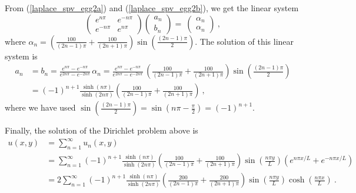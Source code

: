 \begin{egg}
From (\ref{laplace_spv_egg2a}) and (\ref{laplace_spv_egg2b}), we get
the linear system
\[
\begin{pmatrix}
e^{n\pi} & e^{-n\pi} \\
e^{-n\pi} & e^{n\pi}
\end{pmatrix}
\begin{pmatrix}
a_n \\ b_n
\end{pmatrix}
=\
\begin{pmatrix}
 \alpha_n \\ \alpha_n
\end{pmatrix} \ ,
\]
where
$\displaystyle
\alpha_n = \left( \frac{100}{(2n-1)\pi} + \frac{100}{(2n+1)\pi}\right)
\sin\left(\frac{(2n-1)\pi}{2}\right)$.
The solution of this linear system is
\begin{align*}
a_n &= b_n = \frac{e^{n\pi} - e^{-n\pi}}{e^{2n\pi}- e^{-2n\pi}}\,\alpha_n
=\frac{e^{n\pi} - e^{-n\pi}}{e^{2n\pi}- e^{-2n\pi}}\,
\left( \frac{100}{(2n-1)\pi} + \frac{100}{(2n+1)\pi}\right)
\sin\left(\frac{(2n-1)\pi}{2}\right) \\
&= (-1)^{n+1}\frac{\sinh(n\pi)}{\sinh(2n\pi)}
\left( \frac{100}{(2n-1)\pi} + \frac{100}{(2n+1)\pi}\right) \ ,
\end{align*}
where we have used $\displaystyle \sin\left(\frac{(2n-1)\pi}{2}\right)
=\sin\left(n\pi - \frac{\pi}{2}\right) = (-1)^{n+1}$.

Finally, the solution of the Dirichlet problem above is 
\begin{align*}
u(x,y) &= \sum_{n=1}^\infty u_n(x,y) \\
& = \sum_{n=1}^\infty
(-1)^{n+1}\frac{\sinh(n\pi)}{\sinh(2n\pi)}
\left( \frac{100}{(2n-1)\pi} + \frac{100}{(2n+1)\pi}\right)
\sin\left(\frac{n\pi y}{L}\right)
\left(e^{n\pi x/L} + e^{-n\pi x/L}\right) \\
& = 2\sum_{n=1}^\infty
(-1)^{n+1}\frac{\sinh(n\pi)}{\sinh(2n\pi)}
\left( \frac{200}{(2n-1)\pi} + \frac{200}{(2n+1)\pi}\right)
\sin\left(\frac{n\pi y}{L}\right)\cosh\left(\frac{n\pi x}{L}\right) \ .
\end{align*}
\end{egg}

